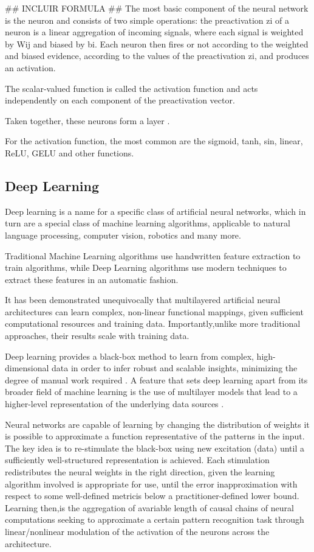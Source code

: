 ## INCLUIR FORMULA ## 
The most basic component of the neural network is the neuron and consists of two simple operations: the preactivation zi of a neuron is a linear aggregation of incoming signals, where each signal is weighted by Wij and biased by bi. Each neuron then fires or not according to the weighted and biased evidence, according to the values of the preactivation zi, and produces an activation.

The scalar-valued function is called the activation function and acts independently on each component of the preactivation vector. 

Taken together, these neurons form a layer \cite{rfc27}.

For the activation function, the most common are the sigmoid, tanh, sin, linear, ReLU, GELU and other functions.

\subsection{Deep Learning}

Deep learning is a name for a specific class of artificial neural networks, which in turn are a special class of machine learning algorithms, applicable to natural language processing, computer vision, robotics and many more.\cite{rfc22}

Traditional Machine Learning algorithms use handwritten feature extraction to train algorithms, while Deep Learning algorithms use modern techniques to extract these features in an automatic fashion.\cite{rfc23}

It has been demonstrated unequivocally that multilayered artificial neural architectures can learn complex, non-linear functional mappings, given sufficient computational resources and training data. Importantly,unlike more traditional approaches, their results scale with training data\cite{rfc24}.

Deep learning provides a black-box method to learn from complex, high-dimensional data in order to infer robust and scalable insights, minimizing the degree of manual work required \cite{rfc23}. A feature that sets deep learning apart from its broader field of machine learning is the use of multilayer models that lead to a higher-level representation of the underlying data sources \cite{rfc24}.

Neural networks are capable of learning by changing the distribution of weights it is possible to approximate a function representative of the patterns in the input. The key idea is to re-stimulate the black-box using new excitation (data) until a sufficiently well-structured representation is achieved. Each stimulation redistributes the neural weights in the right direction, given the learning algorithm involved is appropriate for use, until the error inapproximation with respect to some well-defined metricis below a practitioner-defined lower bound. Learning then,is the aggregation of avariable length of causal chains of neural computations \cite{rfc26} seeking to approximate a certain pattern recognition task through linear/nonlinear modulation of the activation of the neurons across the architecture.

